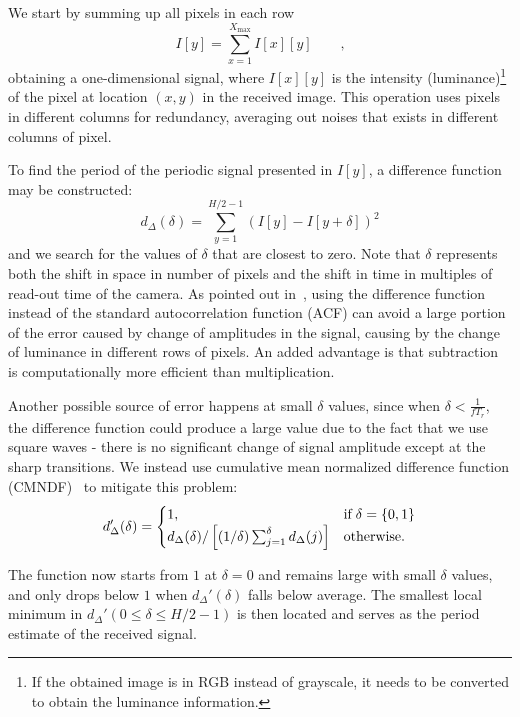 We start by summing up all pixels in each row
\begin{equation}
	I[y]=\sum^{X_{\max}}_{x=1} I[x][y] \qquad \textrm{,}
\end{equation}
obtaining a one-dimensional signal, where $I[x][y]$ is the intensity (luminance)\footnote{If the obtained image is in RGB instead of grayscale, it needs to be converted to obtain the luminance information.} of the pixel at location $(x,y)$ in the received image. This operation uses pixels in different columns for redundancy, averaging out noises that exists in different columns of pixel. 

To find the period of the periodic signal presented in $I[y]$, a difference function may be constructed:
\begin{equation}
	d_\Delta(\delta)=\sum^{H/2-1}_{y=1} (I[y] - I[y+\delta])^2
\end{equation}
and we search for the values of $\delta$ that are closest to zero. Note that $\delta$ represents both the shift in space in number of pixels and the shift in time in multiples of read-out time of the camera. As pointed out in~\cite{de2002yin}, using the difference function instead of the standard autocorrelation function (ACF) can avoid a large portion of the error caused by change of amplitudes in the signal, causing by the change of luminance in different rows of pixels. An added advantage is that subtraction is computationally more efficient than multiplication. 

Another possible source of error happens at small $\delta$ values, since when $\delta<\frac{1}{f T_r}$, the difference function could produce a large value due to the fact that we use square waves - there is no significant change of signal amplitude except at the sharp transitions. We instead use cumulative mean normalized difference function (CMNDF)~\cite{de2002yin} to mitigate this problem:
\begin{equation}
	d_\Delta'(\delta) =\begin{cases} 1, & \textrm{if\;} \delta=\{0,1\} \\
	d_\Delta(\delta) / \left [ (1/\delta) \sum^\delta_{j=1} d_\Delta(j) \right ] & \textrm{otherwise.} \end{cases}
\end{equation}

The function now starts from $1$ at $\delta=0$ and remains large with small $\delta$ values, and only drops below $1$ when $d_\Delta'(\delta)$ falls below average. The smallest local minimum in $d_\Delta'(0 \leq \delta \leq H/2-1)$ is then located and serves as the period estimate of the received signal.  

